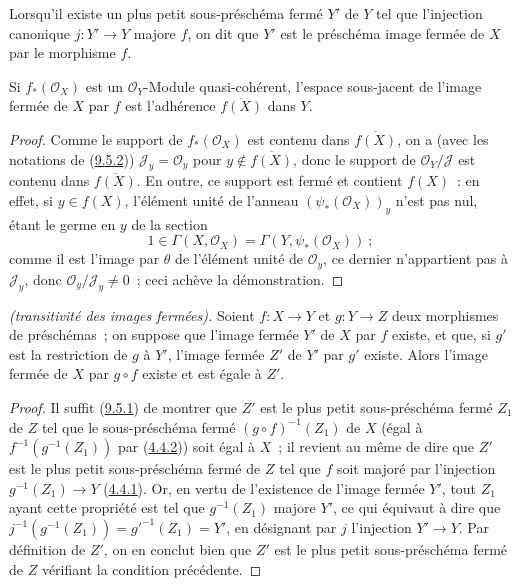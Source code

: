 \begin{definition}[9.5.3]
\label{I.9.5.3-fr}
Lorsqu'il existe un plus petit sous-préschéma fermé $Y'$ de $Y$ tel que
l'injection canonique $j:Y'\to Y$ majore $f$, on dit que $Y'$ est le
préschéma image fermée de $X$ par le morphisme $f$.
\end{definition}

\begin{proposition}[9.5.4]
\label{I.9.5.4-fr}
Si $f_*(\mathscr{O}_X)$ est un $\mathscr{O}_Y$-Module quasi-cohérent,
l'espace sous-jacent de l'image fermée de $X$ par $f$ est l'adhérence
$\overline{f(X)}$ dans $Y$.
\end{proposition}

\begin{proof}
Comme le support de $f_*(\mathscr{O}_X)$ est contenu dans
$\overline{f(X)}$, on a (avec les notations de
(\hyperref[I.9.5.2-fr]{9.5.2})) $\mathscr{J}_y=\mathscr{O}_y$ pour
$y\notin\overline{f(X)}$, donc le support de
$\mathscr{O}_Y/\mathscr{J}$ est contenu dans $\overline{f(X)}$. En outre, ce
support est fermé et contient $f(X)$~: en effet, si $y\in f(X)$, l'élément
unité de l'anneau $(\psi_*(\mathscr{O}_X))_y$ n'est pas nul, étant le germe
en $y$ de la section
\[
  1\in\Gamma(X,\mathscr{O}_X)=\Gamma(Y,\psi_*(\mathscr{O}_X))~;
\]
comme il est l'image par $\theta$ de l'élément unité de $\mathscr{O}_y$, ce
dernier n'appartient pas à $\mathscr{J}_y$, donc
$\mathscr{O}_y/\mathscr{J}_y\neq0$~; ceci achève la démonstration.
\end{proof}

\begin{proposition}[9.5.5]
\label{I.9.5.5-fr}
\emph{(transitivité des images fermées).} Soient $f:X\to Y$ et $g:Y\to Z$
deux morphismes de préschémas~; on suppose que l'image fermée $Y'$ de $X$
par $f$ existe, et que, si $g'$ est la restriction de $g$ à $Y'$, l'image
fermée $Z'$ de $Y'$ par $g'$ existe. Alors l'image fermée de $X$ par
$g\circ f$ existe et est égale à $Z'$.
\end{proposition}

\begin{proof}
Il suffit (\hyperref[I.9.5.1-fr]{9.5.1}) de montrer que $Z'$ est le plus
petit sous-préschéma fermé $Z_1$ de $Z$ tel que le sous-préschéma fermé
$(g\circ f)^{-1}(Z_1)$ de $X$ (égal à $f^{-1}(g^{-1}(Z_1))$ par
(\hyperref[I.4.4.2-fr]{4.4.2})) soit égal à $X$~; il revient au même de dire
que $Z'$ est le plus petit sous-préschéma fermé de $Z$ tel que $f$ soit
majoré par l'injection $g^{-1}(Z_1)\to Y$
(\hyperref[I.4.4.1-fr]{4.4.1}). Or, en vertu de l'existence de l'image
fermée $Y'$, tout $Z_1$ ayant cette propriété est tel que $g^{-1}(Z_1)$
majore $Y'$, ce qui équivaut à dire que
$j^{-1}(g^{-1}(Z_1))=g'^{-1}(Z_1)=Y'$, en désignant par $j$ l'injection
$Y'\to Y$. Par définition de $Z'$, on en conclut bien que $Z'$ est le plus
petit sous-préschéma fermé de $Z$ vérifiant la condition précédente.
\end{proof}

